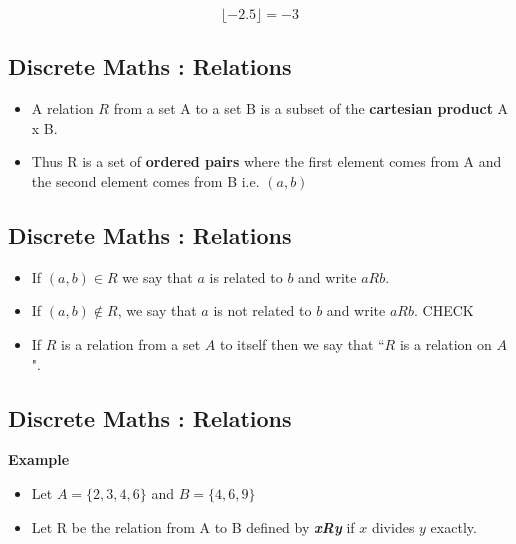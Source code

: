 \documentclass[]{report}
\begin{document}
\[  \lfloor -2.5 \rfloor  = -3  \]








\subsection{Discrete Maths : Relations}

\begin{itemize}
\item A relation $R$ from a set A to a set B is a subset of the
\textbf{cartesian product} A x B. 
\item Thus R is a set of \textbf{ordered pairs} where
the first element comes from A and the second element comes
from B i.e. $(a, b)$
\end{itemize}


\subsection{Discrete Maths : Relations}

\begin{itemize}

\item  If $(a, b) \in R$ we say that $a$ is related to $b$ and write $aRb$.
\item If $(a, b) \notin R$, we say that $a$ is not related to $b$ and write $aRb$. CHECK
\item If
$R$ is a relation from a set $A$ to itself then we say that ``$R$ is a relation
on $A$".
\end{itemize}


\subsection{Discrete Maths : Relations}

\textbf{Example}
\begin{itemize}
\item Let $A = \{2, 3, 4, 6\}$ and $B = \{4, 6, 9\}$
\item Let R be the relation from A to B defined by \textit{\textbf{xRy}} if $x$
divides $y$ exactly.
\end{itemize}
\end{document}
